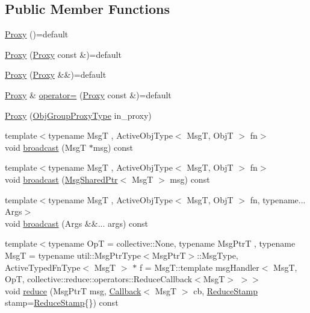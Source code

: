\subsection*{Public Member Functions}
\begin{DoxyCompactItemize}
\item 
\hyperlink{structvt_1_1objgroup_1_1proxy_1_1_proxy_a5450776d9cabb2556765c0d0227c9589}{Proxy} ()=default
\item 
\hyperlink{structvt_1_1objgroup_1_1proxy_1_1_proxy_ad12a9b75a3c4844144d7a159b11af5ec}{Proxy} (\hyperlink{structvt_1_1objgroup_1_1proxy_1_1_proxy}{Proxy} const \&)=default
\item 
\hyperlink{structvt_1_1objgroup_1_1proxy_1_1_proxy_a8711a58bb0444c24553527b6ed9d0cfb}{Proxy} (\hyperlink{structvt_1_1objgroup_1_1proxy_1_1_proxy}{Proxy} \&\&)=default
\item 
\hyperlink{structvt_1_1objgroup_1_1proxy_1_1_proxy}{Proxy} \& \hyperlink{structvt_1_1objgroup_1_1proxy_1_1_proxy_a2fb8dafa11b8c8f70888118bdc2f1b60}{operator=} (\hyperlink{structvt_1_1objgroup_1_1proxy_1_1_proxy}{Proxy} const \&)=default
\item 
\hyperlink{structvt_1_1objgroup_1_1proxy_1_1_proxy_ab76d59446c73ebf1cea9c80fd70fbd6b}{Proxy} (\hyperlink{namespacevt_ad7cae989df485fccca57f0792a880a8e}{Obj\+Group\+Proxy\+Type} in\+\_\+proxy)
\item 
{\footnotesize template$<$typename MsgT , Active\+Obj\+Type$<$ Msg\+T, Obj\+T $>$ fn$>$ }\\void \hyperlink{structvt_1_1objgroup_1_1proxy_1_1_proxy_a0b716ca776b1f06e0d7d45afbe9e5274}{broadcast} (MsgT $\ast$msg) const
\item 
{\footnotesize template$<$typename MsgT , Active\+Obj\+Type$<$ Msg\+T, Obj\+T $>$ fn$>$ }\\void \hyperlink{structvt_1_1objgroup_1_1proxy_1_1_proxy_ad3841e2db7085583868956d97c537ffc}{broadcast} (\hyperlink{namespacevt_ab2b3d506ec8e8d1540aede826d84a239}{Msg\+Shared\+Ptr}$<$ MsgT $>$ msg) const
\item 
{\footnotesize template$<$typename MsgT , Active\+Obj\+Type$<$ Msg\+T, Obj\+T $>$ fn, typename... Args$>$ }\\void \hyperlink{structvt_1_1objgroup_1_1proxy_1_1_proxy_ad4f1ddeb5b09f01643b17a93bbbe82e9}{broadcast} (Args \&\&... args) const
\item 
{\footnotesize template$<$typename OpT  = collective\+::\+None, typename Msg\+PtrT , typename MsgT  = typename util\+::\+Msg\+Ptr\+Type$<$\+Msg\+Ptr\+T$>$\+::\+Msg\+Type, Active\+Typed\+Fn\+Type$<$ Msg\+T $>$ $\ast$ f = Msg\+T\+::template msg\+Handler$<$      Msg\+T, Op\+T, collective\+::reduce\+::operators\+::\+Reduce\+Callback$<$\+Msg\+T$>$    $>$$>$ }\\void \hyperlink{structvt_1_1objgroup_1_1proxy_1_1_proxy_addf812b8ec24f570f3796c78adc7b18d}{reduce} (Msg\+PtrT msg, \hyperlink{namespacevt_a36db99df4c973d48b1118a293fff533f}{Callback}$<$ MsgT $>$ cb, \hyperlink{structvt_1_1objgroup_1_1proxy_1_1_proxy_a337be4c20cf11ff6477c7a66208cc909}{Reduce\+Stamp} stamp=\hyperlink{structvt_1_1objgroup_1_1proxy_1_1_proxy_a337be4c20cf11ff6477c7a66208cc909}{Reduce\+Stamp}\{\}) const

\end{DoxyCompactItemize}
